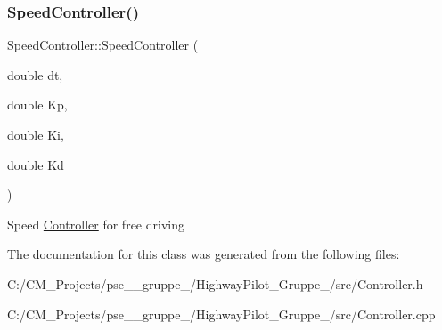 \subsubsection{\texorpdfstring{SpeedController()}{SpeedController()}}
{\footnotesize\ttfamily Speed\+Controller\+::\+Speed\+Controller (\begin{DoxyParamCaption}\item[{double}]{dt,  }\item[{double}]{Kp,  }\item[{double}]{Ki,  }\item[{double}]{Kd }\end{DoxyParamCaption})}

Speed \mbox{\hyperlink{class_controller}{Controller}} for free driving 

The documentation for this class was generated from the following files\+:\begin{DoxyCompactItemize}
\item 
C\+:/\+C\+M\+\_\+\+Projects/pse\+\_\+\_\+gruppe\+\_/\+Highway\+Pilot\+\_\+\+Gruppe\+\_/src/Controller.\+h\item 
C\+:/\+C\+M\+\_\+\+Projects/pse\+\_\+\_\+gruppe\+\_/\+Highway\+Pilot\+\_\+\+Gruppe\+\_/src/Controller.\+cpp\end{DoxyCompactItemize}
